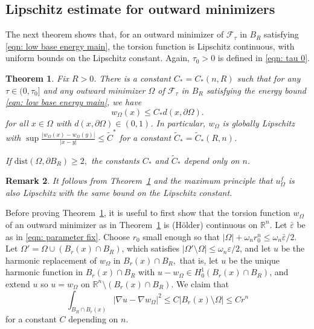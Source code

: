 \documentclass[10pt, reqno]{amsart}
\numberwithin{equation}{section}
\newtheorem{theorem}{Theorem}[section]
\newtheorem{remark}[theorem]{Remark}
\def\R{{\mathbb R}}
\def\e{\varepsilon}
\def\W{\Omega}
\def\om{\omega}
\def\err{\tau}
\def\Ep{\mathcal{F}_{\err}}
\begin{document}
\subsection{Lipschitz estimate for outward minimizers} The next theorem shows that, for an outward minimizer of $\Ep$ in $B_R$ satisfying \eqref{eqn: low base energy main}, the torsion function is Lipschitz continuous, with uniform bounds on the Lipschitz constant. Again, $\tau_0>0$ is defined in \eqref{eqn: tau 0}.
\begin{theorem}\label{thm: Lip} Fix  $R>0$.
	There is a constant $C_*=C_*(n,  R)$ such that for any $\tau \in (0,\tau_0]$ and any outward minimizer $\W$ of $\Ep$ in $B_R$ satisfying the energy bound \eqref{eqn: low base energy main}, we have 
	\begin{equation}\label{def: UP}
	 { w_\W(x)} \leq C_*d(x, \partial \W).
\end{equation}
for all $x \in \W$ with $d(x, \partial \W) \in (0, 1)$.
In particular, $w_\W$ is globally Lipschitz with $\sup \frac{|w_\W(x)- w_\W(y)|}{|x-y|} \leq \tilde{C}^*$ for a constant $\tilde{C}_*=\tilde{C}_*(R, n)$.

If $\text{dist}(\W , \partial B_R) \geq 2,$ the constants $C_*$ and $\tilde{C}_*$ depend only on $n$.
	\end{theorem}
\begin{remark}\label{remark: Lip poisson equation solution}
    {\rm
    It follows from Theorem~\ref{thm: Lip} and the maximum principle that $u_\W^f$ is also Lipschitz with the same bound on the Lipschitz constant.
    }
\end{remark}
Before proving Theorem~\ref{thm: Lip}, it is useful to first show that the torsion function $w_\W$ of an outward minimizer as in Theorem~\ref{thm: Lip} is  (H\"{o}lder) continuous on $\R^n$.
Let $\bar{\e}$ be as in \eqref{eqn: parameter fix}. Choose $r_0$ small enough so that $|\W| + \omega_n r_0^n \leq \om_n \bar{\e} /2$. 
Let $\W' = \W \cup (B_r(x) \cap B_R)$, which satisfies $|\W' \setminus \W| \leq \omega_n \e/2$, and let $u$ be the harmonic replacement of $w_\W$ in $B_r(x) \cap B_R,$ that is, let  $u$ be the unique harmonic function in $B_r(x) \cap B_R$ with $u -w_\W \in H^1_0(B_r(x) \cap B_R)$, and extend $u$ so  $u=w_\W$ on $\R^n \setminus (B_r(x) \cap B_R)$. We claim that 
\begin{equation}
    \label{eqn: main claim}
\int_{B_R\cap B_r(x)} |\nabla u - \nabla w_\W|^2 \leq C |B_r(x) \setminus \W| \leq  C r^n
\end{equation}
for a constant $C$ depending on $n$.
\end{document}
